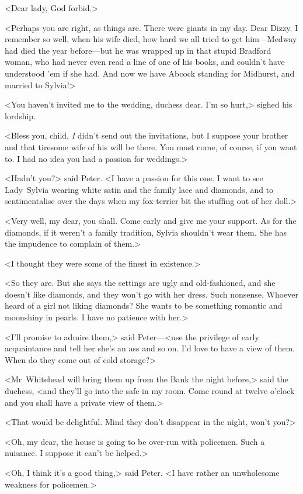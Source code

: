 <Dear lady, God forbid.>

<Perhaps you are right, as things are. There were giants in my day. Dear Dizzy. I remember so well, when his wife died, how hard we all tried to get him—Medway had died the year before—but he was wrapped up in that stupid Bradford woman, who had never even read a line of one of his books, and couldn't have understood 'em if she had. And now we have Abcock standing for Midhurst, and married to Sylvia!>

<You haven't invited me to the wedding, duchess dear. I'm so hurt,> sighed his lordship.

<Bless you, child, \textit{I} didn't send out the invitations, but I suppose your brother and that tiresome wife of his will be there. You must come, of course, if you want to. I had no idea you had a passion for weddings.>

<Hadn't you?> said Peter. <I have a passion for this one. I want to see Lady~Sylvia wearing white satin and the family lace and diamonds, and to sentimentalise over the days when my fox-terrier bit the stuffing out of her doll.>

<Very well, my dear, you shall. Come early and give me your support. As for the diamonds, if it weren't a family tradition, Sylvia shouldn't wear them. She has the impudence to complain of them.>

<I thought they were some of the finest in existence.>

<So they are. But she says the settings are ugly and old-fashioned, and she doesn't like diamonds, and they won't go with her dress. Such nonsense. Whoever heard of a girl not liking diamonds? She wants to be something romantic and moonshiny in pearls. I have no patience with her.>

<I'll promise to admire them,> said Peter—<use the privilege of early acquaintance and tell her she's an ass and so on. I'd love to have a view of them. When do they come out of cold storage?>

<Mr~Whitehead will bring them up from the Bank the night before,> said the duchess, <and they'll go into the safe in my room. Come round at twelve o'clock and you shall have a private view of them.>

<That would be delightful. Mind they don't disappear in the night, won't you?>

<Oh, my dear, the house is going to be over-run with policemen. Such a nuisance. I suppose it can't be helped.>

<Oh, I think it's a good thing,> said Peter. <I have rather an unwholesome weakness for policemen.>

